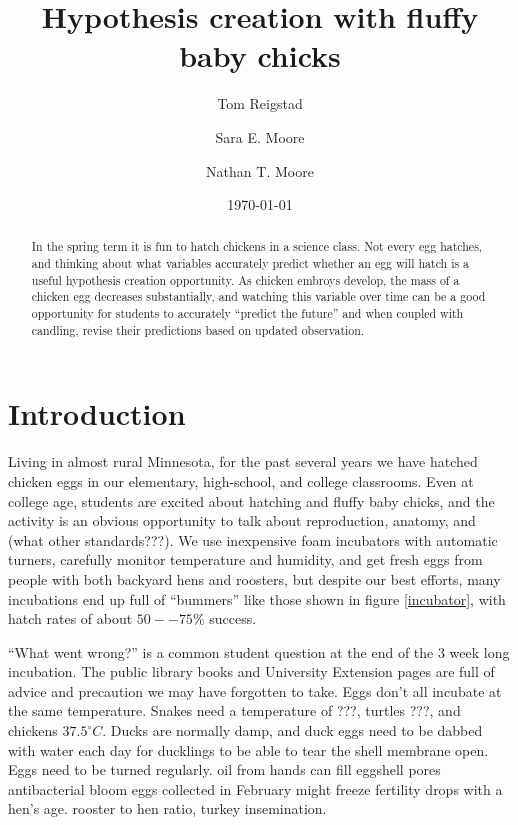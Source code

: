 \documentclass[prb,preprint]{revtex4-2}
\newcommand{\degC}{^{\circ}C}
\begin{document}
\title{Hypothesis creation with fluffy baby chicks} 

\author{Tom Reigstad}

\author{Sara E. Moore}
\email{}


\author{Nathan T. Moore}

\date{\today}

\begin{abstract}
In the spring term it is fun to hatch chickens in a science class. 
Not every egg hatches, and thinking about what variables accurately predict whether an egg will hatch is a useful hypothesis creation opportunity.
As chicken embroys develop, the mass of a chicken egg decreases substantially, and watching this variable over time can be a good opportunity for students to accurately ``predict the future'' and when coupled with candling, revise their predictions based on updated observation. 
\end{abstract}
\maketitle

\section{Introduction}
Living in almost rural Minnesota, for the past several years we have hatched chicken eggs in our elementary, high-school, and college classrooms.  Even at college age, students are excited about hatching and fluffy baby chicks, and the activity is an obvious opportunity to talk about reproduction, anatomy, and (what other standards???).  We use inexpensive foam incubators\cite{incubator_source} with automatic turners, carefully monitor temperature and humidity, and get fresh eggs from people with both backyard hens and roosters, but despite our best efforts, many incubations end up full of ``bummers'' like those shown in figure \ref{incubator}, with hatch rates of about $50--75\%$ success. 

``What went wrong?'' is a common student question at the end of the 3 week long incubation.  The public library books \cite{chicken_ref} and University Extension pages \cite{U_extension} are full of advice and precaution we may have forgotten to take.  Eggs don't all incubate at the same temperature.  Snakes need a temperature of ???, turtles ???, and chickens $37.5\degC$.  
Ducks are normally damp, and duck eggs need to be dabbed with water each day for ducklings to be able to tear the shell membrane open.  
Eggs need to be turned regularly.
oil from hands can fill eggshell pores
antibacterial bloom
eggs collected in February might freeze
fertility drops with a hen's age.
rooster to hen ratio, turkey insemination. 
\end{document}
